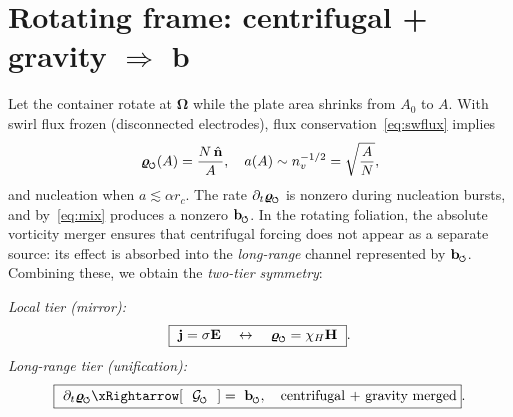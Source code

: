 \documentclass[reprint,aps,onecolumn,nofootinbib]{revtex4-2}
\newcommand{\swirlarrow}{%
	\mathchoice{\mkern-2mu\scriptstyle\boldsymbol{\circlearrowleft}}%
	{\mkern-2mu\scriptstyle\boldsymbol{\circlearrowleft}}%
	{\mkern-2mu\scriptscriptstyle\boldsymbol{\circlearrowleft}}%
	{\mkern-2mu\scriptscriptstyle\boldsymbol{\circlearrowleft}}%
}
\begin{document}
\section{Rotating frame: centrifugal + gravity $\Rightarrow$ $\mathbf b$}
Let the container rotate at $\boldsymbol\Omega$ while the plate area shrinks from $A_0$ to $A$. With swirl flux frozen (disconnected electrodes), flux conservation~\eqref{eq:swflux} implies
\begin{equation}
\bm{\varrho}_{\swirlarrow}(A) = \frac{N \,\hat{\mathbf n}}{A},
\quad a(A)\sim n_v^{-1/2}=\sqrt{\frac{A}{N}},
\end{equation}
and nucleation when $a\lesssim \alpha r_c$. The rate $\partial_t \bm{\varrho}_{\swirlarrow}$ is nonzero during nucleation bursts, and by~\eqref{eq:mix} produces a nonzero $\mathbf b_{\swirlarrow}$. In the rotating foliation, the absolute vorticity merger ensures that centrifugal forcing does not appear as a separate source: its effect is absorbed into the \emph{long-range} channel represented by $\mathbf b_{\swirlarrow}$. Combining these, we obtain the \emph{two-tier symmetry}:

\medskip
\noindent\emph{Local tier (mirror):}
\[
    \boxed{\ \mathbf j=\sigma\mathbf E \quad \leftrightarrow \quad \bm{\varrho}_{\swirlarrow}=\chi_H\mathbf H\ }.
\]
\noindent\emph{Long-range tier (unification):}
\[
    \boxed{\ \partial_t \bm{\varrho}_{\swirlarrow} \xRightarrow[\ \ \mathcal G_{\swirlarrow}\ \ ] = \ \mathbf b_{\swirlarrow},
        \quad \text{centrifugal + gravity merged} }.
\]

\end{document}
